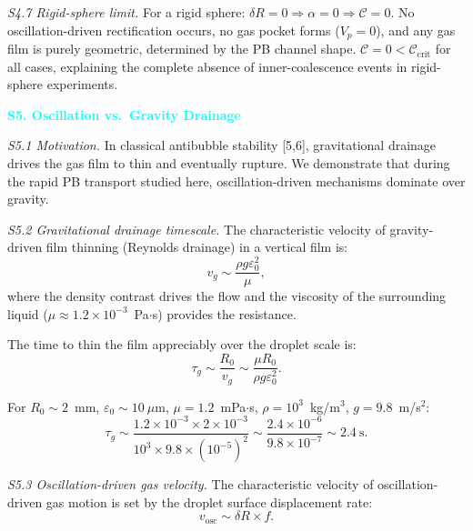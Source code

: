 \documentclass[%
 preprint,
 superscriptaddress,
 amsmath,amssymb,
 aps, prl,
]{revtex4-2}
\begin{document}
{\noindent\textit{S4.7 Rigid-sphere limit.}}
For a rigid sphere: $\delta R = 0 \Rightarrow \alpha = 0 \Rightarrow \mathcal{C} = 0$. No oscillation-driven rectification occurs, no gas pocket forms ($V_p = 0$), and any gas film is purely geometric, determined by the PB channel shape. $\mathcal{C} = 0 < \mathcal{C}_{\text{crit}}$ for all cases, explaining the complete absence of inner-coalescence events in rigid-sphere experiments.\par

\textcolor{cyan}{\textbf{S5. Oscillation vs.\ Gravity Drainage}}\par

{\noindent\textit{S5.1 Motivation.}}
In classical antibubble stability [5,6], gravitational drainage drives the gas film to thin and eventually rupture. We demonstrate that during the rapid PB transport studied here, oscillation-driven mechanisms dominate over gravity.\par

{\noindent\textit{S5.2 Gravitational drainage timescale.}}
The characteristic velocity of gravity-driven film thinning (Reynolds drainage) in a vertical film is:
\begin{equation}
v_g \sim \frac{\rho g \varepsilon_0^2}{\mu},
\label{eq:s5_vg}
\end{equation}
where the density contrast drives the flow and the viscosity of the surrounding liquid ($\mu \approx 1.2 \times 10^{-3}$~Pa$\cdot$s) provides the resistance.\par

The time to thin the film appreciably over the droplet scale is:
\begin{equation}
\tau_g \sim \frac{R_0}{v_g}
\sim \frac{\mu R_0}{\rho g \varepsilon_0^2}.
\label{eq:s5_taug}
\end{equation}

For $R_0 \sim 2$~mm, $\varepsilon_0 \sim 10~\mu$m, $\mu = 1.2$~mPa$\cdot$s, $\rho = 10^3$~kg/m$^3$, $g = 9.8$~m/s$^2$:
\begin{equation}
\tau_g \sim \frac{1.2\times10^{-3} \times 2\times10^{-3}}
{10^3 \times 9.8 \times (10^{-5})^2}
\sim \frac{2.4\times10^{-6}}{9.8\times10^{-7}}
\sim 2.4~\text{s}.
\label{eq:s5_taug_num}
\end{equation}

{\noindent\textit{S5.3 Oscillation-driven gas velocity.}}
The characteristic velocity of oscillation-driven gas motion is set by the droplet surface displacement rate:
\begin{equation}
v_{\text{osc}} \sim \delta R \times f.
\label{eq:s5_vosc}
\end{equation}
\end{document}

